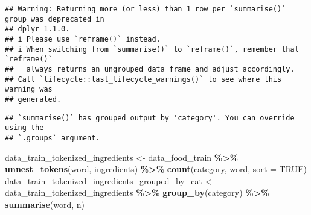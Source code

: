 \documentclass[
]{article}
\newenvironment{Shaded}{\begin{snugshade}}{\end{snugshade}}
\newcommand{\AttributeTok}[1]{\textcolor[rgb]{0.13,0.29,0.53}{#1}}
\newcommand{\ConstantTok}[1]{\textcolor[rgb]{0.56,0.35,0.01}{#1}}
\newcommand{\FunctionTok}[1]{\textcolor[rgb]{0.13,0.29,0.53}{\textbf{#1}}}
\newcommand{\NormalTok}[1]{#1}
\newcommand{\OtherTok}[1]{\textcolor[rgb]{0.56,0.35,0.01}{#1}}
\newcommand{\SpecialCharTok}[1]{\textcolor[rgb]{0.81,0.36,0.00}{\textbf{#1}}}
\newcommand{\StringTok}[1]{\textcolor[rgb]{0.31,0.60,0.02}{#1}}
\begin{document}
\begin{verbatim}
## Warning: Returning more (or less) than 1 row per `summarise()` group was deprecated in
## dplyr 1.1.0.
## i Please use `reframe()` instead.
## i When switching from `summarise()` to `reframe()`, remember that `reframe()`
##   always returns an ungrouped data frame and adjust accordingly.
## Call `lifecycle::last_lifecycle_warnings()` to see where this warning was
## generated.
\end{verbatim}

\begin{verbatim}
## `summarise()` has grouped output by 'category'. You can override using the
## `.groups` argument.
\end{verbatim}

\begin{Shaded}
\end{Shaded}

\begin{Shaded}
\begin{Highlighting}[]
\NormalTok{data\_train\_tokenized\_ingredients }\OtherTok{\textless{}{-}}\NormalTok{ data\_food\_train }\SpecialCharTok{\%\textgreater{}\%} \FunctionTok{unnest\_tokens}\NormalTok{(word, ingredients) }\SpecialCharTok{\%\textgreater{}\%} \FunctionTok{count}\NormalTok{(category, word, }\AttributeTok{sort =} \ConstantTok{TRUE}\NormalTok{)}
\NormalTok{data\_train\_tokenized\_ingredients\_grouped\_by\_cat }\OtherTok{\textless{}{-}}\NormalTok{ data\_train\_tokenized\_ingredients }\SpecialCharTok{\%\textgreater{}\%} \FunctionTok{group\_by}\NormalTok{(category) }\SpecialCharTok{\%\textgreater{}\%} \FunctionTok{summarise}\NormalTok{(word, n)}
\end{Highlighting}
\end{Shaded}
\end{document}

